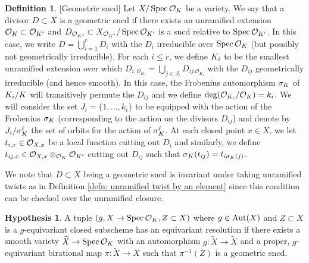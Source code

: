 \documentclass[10pt]{article}
\theoremstyle{plain}
\theoremstyle{definition}
\newtheorem{definition}[theorem]{Definition}
\newtheorem{hypothesis}[theorem]{Hypothesis}
\numberwithin{equation}{section}
\begin{document}
\begin{definition}\label{defn: geometric sncd}[Geometric sncd]
Let $X/\operatorname{Spec} {{\mathcal O}_{K}}$ be a variety. We say that a divisor $D\subset X$ is a geometric sncd if there exists an unramified extension ${{\mathcal O}_{K}} \subset \mathcal O_{K'}$ and $D_{\mathcal O_{K'}} \subset X_{\mathcal O_{K'}}/\operatorname{Spec} \mathcal O_{K'}$ is a sncd relative to $\operatorname{Spec} \mathcal O_{K'}$. In this case, we write $D = \bigcup_{i=1}^{r}D_i$ with the $D_i$ irreducible over $\operatorname{Spec} {{\mathcal O}_{K}}$ (but possibly not geometrically irreducible). For each $i \leq r$, we define $K_i$ to be the smallest unramified extension over which $D_{i,\mathcal O_{K_i}} = \bigcup_{j \in J_i}D_{ij.\mathcal O_{K_i}}$ with the $D_{ij}$ geometrically irreducible (and hence smooth). In this case, the Frobenius automorphism $\sigma_K$ of $K_i/K$ will transitively permute the $D_{ij}$ and we define $\deg(\mathcal O_{K_i}/{{\mathcal O}_{K}}) = k_i$. We will consider the set $J_i = \{{1},\dots,{k_i}\}$ to be equipped with the action of the Frobenius $\sigma_K$ (corresponding to the action on the divisors $D_{ij}$) and denote by $J_i/\sigma_K^\ell$ the set of orbits for the action of $\sigma_K^\ell$. At each closed point $x \in X$, we let $t_{i,x} \in {\mathcal O}_{X,x}$ be a local function cutting out $D_i$ and similarly, we define $t_{ij,x} \in {\mathcal O}_{X,x}\otimes_{{{\mathcal O}_{K}}}\mathcal O_{K'}$ cutting out $D_{ij}$ such that $\sigma_K(t_{ij}) = t_{i\sigma_K(j)}$.

\end{definition}


We note that $D \subset X$ being a geometric sncd is invariant under taking unramified twists as in Definition \ref{defn: unramified twist by an element} since this condition can be checked over the unramified closure.

\begin{hypothesis}
\label{hypothesis:res of sing}
A tuple $(g,X\to\operatorname{Spec}{{\mathcal O}_{K}}, Z \subset X)$ where $g \in \operatorname{Aut}(X)$ and $Z \subset X$ is a $g$-equivariant closed subscheme has an equivariant resolution if there exists a smooth variety $\widetilde{X} \to \operatorname{Spec} {{\mathcal O}_{K}}$ with an automorphism $g: \widetilde{X} \to \widetilde{X}$ and a proper, $g$-equivariant birational map $\pi: \widetilde{X} \to X$ such that $\pi^{-1}(Z)$ is a geometric sncd. 

\end{hypothesis}

\end{document}
